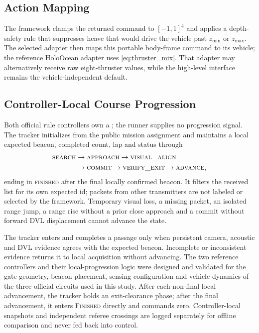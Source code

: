 \subsection{Action Mapping}

The framework clamps the returned command to $[-1,1]^4$ and applies a depth-safety rule that suppresses heave that would drive the vehicle past $z_{\min}$ or $z_{\max}$. The selected adapter then maps this portable body-frame command to its vehicle; the reference HoloOcean adapter uses \eqref{eq:thruster_mix}. That adapter may alternatively receive raw eight-thruster values, while the high-level interface remains the vehicle-independent default.

\subsection{Controller-Local Course Progression}

Both official rule controllers own a ; the runner supplies no progression signal. The tracker initializes from the public mission assignment  and maintains a local expected beacon, completed count, lap and status through
\begin{equation*}
\begin{aligned}
\textsc{search}&\rightarrow\textsc{approach}\rightarrow\textsc{visual\_align}\\
&\rightarrow\textsc{commit}\rightarrow\textsc{verify\_exit}\rightarrow\textsc{advance},
\end{aligned}
\end{equation*}
ending in \textsc{finished} after the final locally confirmed beacon. It filters the received list for its own expected id; packets from other transmitters are not labeled or selected by the framework. Temporary visual loss, a missing packet, an isolated range jump, a range rise without a prior close approach and a commit without forward DVL displacement cannot advance the state.

The tracker enters and completes a passage only when persistent camera, acoustic and DVL evidence agrees with the expected beacon. Incomplete or inconsistent evidence returns it to local acquisition without advancing. The two reference controllers and their local-progression logic were designed and validated for the gate geometry, beacon placement, sensing configuration and vehicle dynamics of the three official circuits used in this study. After each non-final local advancement, the tracker holds an exit-clearance phase; after the final advancement, it enters \textsc{Finished} directly and commands zero. Controller-local snapshots and independent referee crossings are logged separately for offline comparison and never fed back into control.

